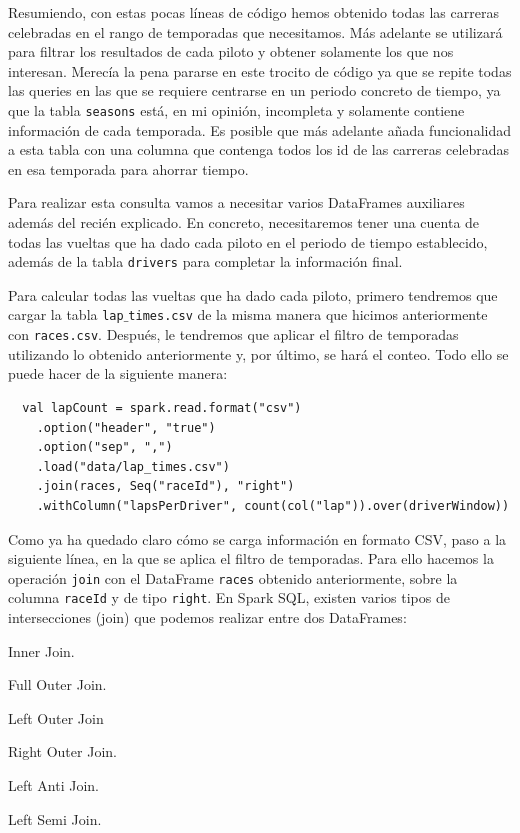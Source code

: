 \documentclass[12pt,twoside,titlepage]{report}
\begin{document}
Resumiendo, con estas pocas líneas de código hemos obtenido todas las carreras celebradas en el rango de temporadas que necesitamos. Más adelante se utilizará para filtrar los resultados de cada piloto y obtener solamente los que nos interesan. Merecía la pena pararse en este trocito de código ya que se repite todas las queries en las que se requiere centrarse en un periodo concreto de tiempo, ya que la tabla \texttt{seasons} está, en mi opinión, incompleta y solamente contiene información de cada temporada. Es posible que más adelante añada funcionalidad a esta tabla con una columna que contenga todos los id de las carreras celebradas en esa temporada para ahorrar tiempo.

Para realizar esta consulta vamos a necesitar varios DataFrames auxiliares además del recién explicado. En concreto, necesitaremos tener una cuenta de todas las vueltas que ha dado cada piloto en el periodo de tiempo establecido, además de la tabla \texttt{drivers} para completar la información final.

Para calcular todas las vueltas que ha dado cada piloto, primero tendremos que cargar la tabla \texttt{lap$\_$times.csv} de la misma manera que hicimos anteriormente con \texttt{races.csv}. Después, le tendremos que aplicar el filtro de temporadas utilizando lo obtenido anteriormente y, por último, se hará el conteo. Todo ello se puede hacer de la siguiente manera:

\begin{lstlisting}
  val lapCount = spark.read.format("csv")
    .option("header", "true")
    .option("sep", ",")
    .load("data/lap_times.csv")
    .join(races, Seq("raceId"), "right")
    .withColumn("lapsPerDriver", count(col("lap")).over(driverWindow))
\end{lstlisting}

Como ya ha quedado claro cómo se carga información en formato CSV, paso a la siguiente línea, en la que se aplica el filtro de temporadas. Para ello hacemos la operación \texttt{join} con el DataFrame \texttt{races} obtenido anteriormente, sobre la columna \texttt{raceId} y de tipo \texttt{right}. En Spark SQL, existen varios tipos de intersecciones (join) que podemos realizar entre dos DataFrames:

\begin{compactitem}
  \item Inner Join.
  \item Full Outer Join.
  \item Left Outer Join
  \item Right Outer Join.
  \item Left Anti Join.
  \item Left Semi Join.
\end{compactitem}
\end{document}
